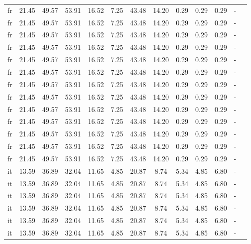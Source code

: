 \begin{table}[H]
\begin{tabularx}{\textwidth}{Xcccccccccccc}
            fr & 21.45 & 49.57 & 53.91 & 16.52 & 7.25 & 43.48 & 14.20 & 0.29 & 0.29 & 0.29 & - \\
            fr & 21.45 & 49.57 & 53.91 & 16.52 & 7.25 & 43.48 & 14.20 & 0.29 & 0.29 & 0.29 & - \\
            fr & 21.45 & 49.57 & 53.91 & 16.52 & 7.25 & 43.48 & 14.20 & 0.29 & 0.29 & 0.29 & - \\
            fr & 21.45 & 49.57 & 53.91 & 16.52 & 7.25 & 43.48 & 14.20 & 0.29 & 0.29 & 0.29 & - \\
            fr & 21.45 & 49.57 & 53.91 & 16.52 & 7.25 & 43.48 & 14.20 & 0.29 & 0.29 & 0.29 & - \\
            fr & 21.45 & 49.57 & 53.91 & 16.52 & 7.25 & 43.48 & 14.20 & 0.29 & 0.29 & 0.29 & - \\
            fr & 21.45 & 49.57 & 53.91 & 16.52 & 7.25 & 43.48 & 14.20 & 0.29 & 0.29 & 0.29 & - \\
            fr & 21.45 & 49.57 & 53.91 & 16.52 & 7.25 & 43.48 & 14.20 & 0.29 & 0.29 & 0.29 & - \\
            fr & 21.45 & 49.57 & 53.91 & 16.52 & 7.25 & 43.48 & 14.20 & 0.29 & 0.29 & 0.29 & - \\
            fr & 21.45 & 49.57 & 53.91 & 16.52 & 7.25 & 43.48 & 14.20 & 0.29 & 0.29 & 0.29 & - \\
            fr & 21.45 & 49.57 & 53.91 & 16.52 & 7.25 & 43.48 & 14.20 & 0.29 & 0.29 & 0.29 & - \\
            fr & 21.45 & 49.57 & 53.91 & 16.52 & 7.25 & 43.48 & 14.20 & 0.29 & 0.29 & 0.29 & - \\
            fr & 21.45 & 49.57 & 53.91 & 16.52 & 7.25 & 43.48 & 14.20 & 0.29 & 0.29 & 0.29 & - \\
            it & 13.59 & 36.89 & 32.04 & 11.65 & 4.85 & 20.87 & 8.74 & 5.34 & 4.85 & 6.80 & - \\
            it & 13.59 & 36.89 & 32.04 & 11.65 & 4.85 & 20.87 & 8.74 & 5.34 & 4.85 & 6.80 & - \\
            it & 13.59 & 36.89 & 32.04 & 11.65 & 4.85 & 20.87 & 8.74 & 5.34 & 4.85 & 6.80 & - \\
            it & 13.59 & 36.89 & 32.04 & 11.65 & 4.85 & 20.87 & 8.74 & 5.34 & 4.85 & 6.80 & - \\
            it & 13.59 & 36.89 & 32.04 & 11.65 & 4.85 & 20.87 & 8.74 & 5.34 & 4.85 & 6.80 & - \\
            it & 13.59 & 36.89 & 32.04 & 11.65 & 4.85 & 20.87 & 8.74 & 5.34 & 4.85 & 6.80 & - \\

\end{tabularx}
\end{table}
